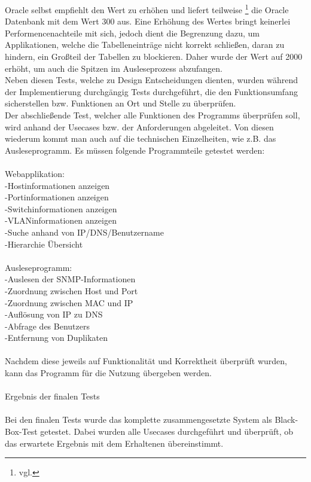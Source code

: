 Oracle selbst empfiehlt den Wert zu erhöhen und liefert teilweise \footnote{vgl.} die Oracle Datenbank mit dem Wert 300 aus. Eine Erhöhung des Wertes bringt keinerlei Performencenachteile mit sich, jedoch dient die Begrenzung dazu, um Applikationen, welche die Tabelleneinträge nicht korrekt schließen, daran zu hindern, ein Großteil der Tabellen zu blockieren. Daher wurde der Wert auf 2000 erhöht, um auch die Spitzen im Ausleseprozess abzufangen.\\
Neben diesen Tests, welche zu Design Entscheidungen dienten, wurden während der Implementierung durchgängig Tests durchgeführt, die den Funktionsumfang sicherstellen bzw. Funktionen an Ort und Stelle zu überprüfen.\\
Der abschließende Test, welcher alle Funktionen des Programms überprüfen soll, wird anhand der Usecases bzw. der Anforderungen abgeleitet. Von diesen wiederum kommt man auch auf die technischen Einzelheiten, wie z.B. das Ausleseprogramm.
Es müssen folgende Programmteile getestet werden:\\
\\
Webapplikation:\\
-Hostinformationen anzeigen\\
-Portinformationen anzeigen\\
-Switchinformationen anzeigen\\
-VLANinformationen anzeigen\\
-Suche anhand von IP/DNS/Benutzername\\
-Hierarchie Übersicht\\
\\
Ausleseprogramm:\\
-Auslesen der SNMP-Informationen\\
-Zuordnung zwischen Host und Port \\
-Zuordnung zwischen MAC und IP\\
-Auflösung von IP zu DNS\\
-Abfrage des Benutzers\\
-Entfernung von Duplikaten\\
\\
Nachdem diese jeweils auf Funktionalität und Korrektheit überprüft wurden, kann das Programm für die Nutzung übergeben werden.\\
\\
Ergebnis der finalen Tests\\
\\
Bei den finalen Tests wurde das komplette zusammengesetzte System als Black-Box-Test getestet.
Dabei wurden alle Usecases durchgeführt und überprüft, ob das erwartete Ergebnis mit dem Erhaltenen übereinstimmt.
